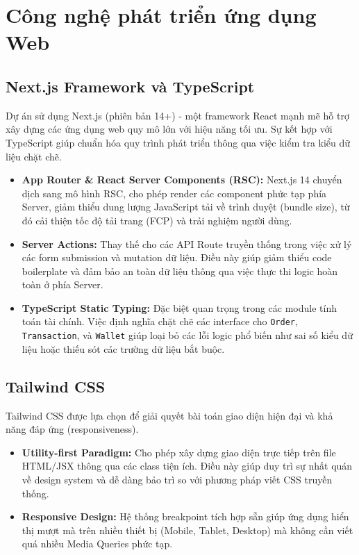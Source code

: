 \documentclass[../main.tex]{subfiles}
\begin{document}
\section{Công nghệ phát triển ứng dụng Web}

\subsection{Next.js Framework và TypeScript}
Dự án sử dụng Next.js (phiên bản 14+) - một framework React mạnh mẽ hỗ trợ xây dựng các ứng dụng web quy mô lớn với hiệu năng tối ưu. Sự kết hợp với TypeScript giúp chuẩn hóa quy trình phát triển thông qua việc kiểm tra kiểu dữ liệu chặt chẽ.
\begin{itemize}
    \item \textbf{App Router \& React Server Components (RSC):} Next.js 14 chuyển dịch sang mô hình RSC, cho phép render các component phức tạp phía Server, giảm thiểu dung lượng JavaScript tải về trình duyệt (bundle size), từ đó cải thiện tốc độ tải trang (FCP) và trải nghiệm người dùng.
    \item \textbf{Server Actions:} Thay thế cho các API Route truyền thống trong việc xử lý các form submission và mutation dữ liệu. Điều này giúp giảm thiểu code boilerplate và đảm bảo an toàn dữ liệu thông qua việc thực thi logic hoàn toàn ở phía Server.
    \item \textbf{TypeScript Static Typing:} Đặc biệt quan trọng trong các module tính toán tài chính. Việc định nghĩa chặt chẽ các interface cho \texttt{Order}, \texttt{Transaction}, và \texttt{Wallet} giúp loại bỏ các lỗi logic phổ biến như sai số kiểu dữ liệu hoặc thiếu sót các trường dữ liệu bắt buộc.
\end{itemize}

\subsection{Tailwind CSS}
Tailwind CSS được lựa chọn để giải quyết bài toán giao diện hiện đại và khả năng đáp ứng (responsiveness).
\begin{itemize}
    \item \textbf{Utility-first Paradigm:} Cho phép xây dựng giao diện trực tiếp trên file HTML/JSX thông qua các class tiện ích. Điều này giúp duy trì sự nhất quán về design system và dễ dàng bảo trì so với phương pháp viết CSS truyền thống.
    \item \textbf{Responsive Design:} Hệ thống breakpoint tích hợp sẵn giúp ứng dụng hiển thị mượt mà trên nhiều thiết bị (Mobile, Tablet, Desktop) mà không cần viết quá nhiều Media Queries phức tạp.
\end{itemize}
\end{document}
